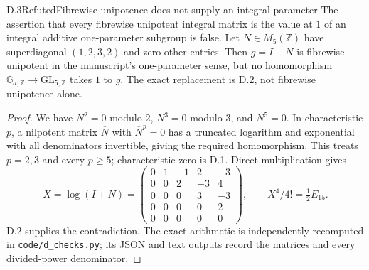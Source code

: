 \begin{statement}{D.3}{Refuted}{Fibrewise unipotence does not supply an integral parameter}
The assertion that every fibrewise unipotent integral matrix is the
value at $1$ of an integral additive one-parameter subgroup is false.
Let $N\in M_5(\mathbb Z)$ have superdiagonal $(1,2,3,2)$ and zero
other entries.  Then $g=I+N$ is fibrewise unipotent in the
manuscript's one-parameter sense, but no homomorphism
$\mathbb G_{a,\mathbb Z}\to\mathrm{GL}_{5,\mathbb Z}$ takes $1$ to $g$.
The exact replacement is D.2, not fibrewise unipotence alone.
\end{statement}
\begin{proof}
We have $N^2=0$ modulo $2$, $N^3=0$ modulo $3$, and $N^5=0$.
In characteristic $p$, a nilpotent matrix $\overline N$ with
$\overline N^p=0$ has a truncated logarithm and exponential with
all denominators invertible, giving the required homomorphism.
This treats $p=2,3$ and every $p\geq5$; characteristic zero is D.1.
Direct multiplication gives
\[
 X=\log(I+N)=
 \begin{pmatrix}
 0&1&-1&2&-3\\0&0&2&-3&4\\0&0&0&3&-3\\
 0&0&0&0&2\\0&0&0&0&0
 \end{pmatrix},\qquad X^4/4!=\tfrac12 E_{15}.
\]
D.2 supplies the contradiction.  The exact arithmetic is independently
recomputed in \texttt{code/d\_checks.py}; its JSON and text outputs
record the matrices and every divided-power denominator.
\end{proof}

